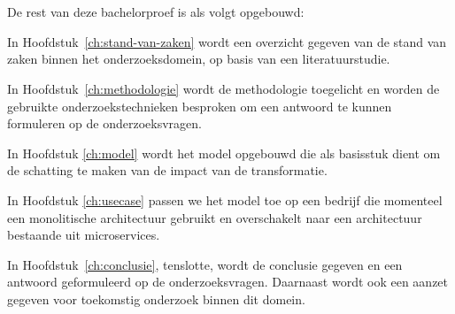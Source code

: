 \section{}
\label{sec:opzet-bachelorproef}


De rest van deze bachelorproef is als volgt opgebouwd:

In Hoofdstuk~\ref{ch:stand-van-zaken} wordt een overzicht gegeven van de stand van zaken binnen het onderzoeksdomein, op basis van een literatuurstudie.

In Hoofdstuk~\ref{ch:methodologie} wordt de methodologie toegelicht en worden de gebruikte onderzoekstechnieken besproken om een antwoord te kunnen formuleren op de onderzoeksvragen.

In Hoofdstuk \ref{ch:model} wordt het model opgebouwd die als basisstuk dient om de schatting te maken van de impact van de transformatie.

In Hoofdstuk \ref{ch:usecase} passen we het model toe op een bedrijf die momenteel een monolitische architectuur gebruikt en overschakelt naar een architectuur bestaande uit microservices.


In Hoofdstuk~\ref{ch:conclusie}, tenslotte, wordt de conclusie gegeven en een antwoord geformuleerd op de onderzoeksvragen. Daarnaast wordt ook een aanzet gegeven voor toekomstig onderzoek binnen dit domein.